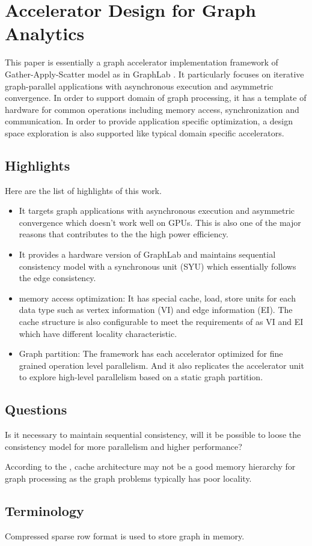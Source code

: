 \section{Accelerator Design for Graph Analytics}
This paper \cite{ozdal2016energy} is essentially a graph accelerator implementation framework of Gather-Apply-Scatter model as in GraphLab \cite{nurvitadhi2014graphgen}. It particularly focuses on iterative graph-parallel applications with asynchronous
execution and asymmetric convergence. In order to support domain of graph processing, it has a
template of hardware for common operations including memory access, synchronization and
communication. In order to provide application specific optimization, a design space exploration is
also supported like typical domain specific accelerators.

\subsection{Highlights}
Here are the list of highlights of this work.
\begin{itemize}
    \item It targets graph applications with asynchronous execution and asymmetric convergence which
        doesn't work well on GPUs. This is also one of the major reasons that contributes to the the high power efficiency.
    \item It provides a hardware version of GraphLab \cite{nurvitadhi2014graphgen} and maintains sequential consistency model with a synchronous unit (SYU) which essentially follows the edge consistency. 
    \item memory access optimization: It has special cache, load, store units for each data type such as vertex information (VI) and edge information (EI). The cache structure is also configurable to meet the requirements of as VI and EI which have different locality characteristic. 
    \item Graph partition: The framework has each accelerator optimized for fine grained operation level parallelism. And it also replicates the accelerator unit to explore high-level parallelism based on a static graph partition.
\end{itemize}

\subsection{Questions}
Is it necessary to maintain sequential consistency, will it be possible to loose the consistency model for more parallelism and higher performance?

According to the , cache architecture may not be a good memory hierarchy for graph processing as the graph problems typically has poor locality. 

\subsection{Terminology}
Compressed sparse row format is used to store graph in memory.

